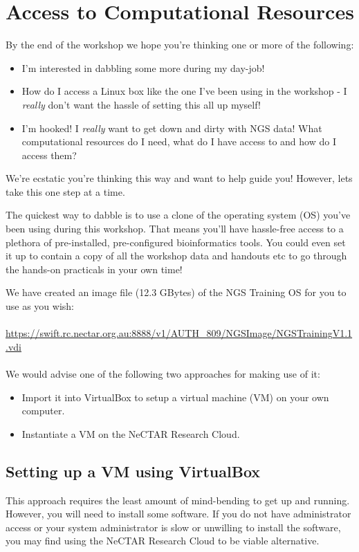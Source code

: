 \section{Access to Computational Resources}

By the end of the workshop we hope you're thinking one or more of the following:

\begin{itemize}
\item I'm interested in dabbling some more during my day-job!
\item How do I access a Linux box like the one I've been using in the workshop -
I \emph{really} don't want the hassle of setting this all up myself!
\item I'm hooked! I \emph{really} want to get down and dirty with NGS data! What
computational resources do I need, what do I have access to and how do I access
them?
\end{itemize}

We're ecstatic you're thinking this way and want to help guide you! However, lets
take this one step at a time.

The quickest way to dabble is to use a clone of the operating system (OS) you've
been using during this workshop. That means you'll have hassle-free access to a
plethora of pre-installed, pre-configured bioinformatics tools. You could even set it
up to contain a copy of all the workshop data and handouts etc to go through the
hands-on practicals in your own time!

We have created an image file (12.3 GBytes) of the NGS Training OS for you to
use as you wish:
\\\\
\url{https://swift.rc.nectar.org.au:8888/v1/AUTH_809/NGSImage/NGSTrainingV1.1.vdi}
\\\\
We would advise one of the following two approaches for making use of it:

\begin{itemize}
\item Import it into VirtualBox to setup a virtual machine (VM) on your own
computer.
\item Instantiate a VM on the NeCTAR Research Cloud.
\end{itemize}

\subsection{Setting up a VM using VirtualBox}
This approach requires the least amount of mind-bending to get up and running.
However, you will need to install some software. If you do not have
administrator access or your system administrator is slow or unwilling to
install the software, you may find using the NeCTAR Research Cloud to be viable
alternative.

